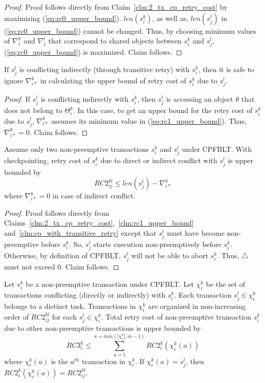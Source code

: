 %
\begin{proof}
%
Proof follows directly from Claim~\ref{clm:2_tx_cp_retry_cost} by maximizing (\ref{eq:rc0_upper_bound}). $len\left(s_i^k\right)$, as well as, $len\left(s_j^l\right)$ in (\ref{eq:rc0_upper_bound}) cannot be changed. Thus, by choosing minimum values of $\nabla_i^k$ and $\nabla_j^l$ that correspond to shared objects between $s_i^k$ and $s_j^l$, (\ref{eq:rc0_upper_bound}) is maximized. Claim follows.
%
\end{proof}
%
\begin{clm}\label{clm:cp_with_transitive_retry}
If $s_j^l$ is conflicting indirectly (through transitive retry) with $s_i^k$, then it is safe to ignore $\nabla_{i*}^k$ in calculating the upper bound of retry cost of $s_i^k$ due to $s_j^l$.
\end{clm}
%
\begin{proof}
If $s_j^l$ is conflicting indirectly with $s_i^k$, then $s_j^l$ is accessing an object $\theta$ that does not belong to $\Theta_i^k$. In this case, to get an upper bound for the retry cost of $s_i^k$ due to $s_j^l$, $\nabla_{i*}^k$ assumes its minimum value in (\ref{eq:rc1_upper_bound}). Thus, $\nabla_{i*}^k=0$. Claim follows.
\end{proof}
%
\begin{clm}\label{clm:non_preemptive_2tx_cpfblt_rc}
Assume only two non-preemptive transactions $s_i^k$ and $s_j^l$ under CPFBLT. With checkpointing, retry cost of $s_i^k$ due to direct or indirect conflict with $s_j^l$ is upper bounded by 
%
\begin{equation}
RC2_{ij}^{kl} \le len\left(s_{j}^{l}\right)-\nabla_{i*}^{k}\label{eq:rc2_upper_bound}
\end{equation}
%
where $\nabla_{i*}^k=0$ in case of indirect conflict.
%
\end{clm}
%
\begin{proof}
Proof follows directly from Claims~\ref{clm:2_tx_cp_retry_cost},~\ref{clm:rc1_upper_bound} and~\ref{clm:cp_with_transitive_retry} except that $s_j^l$ must have become non-preemptive before $s_i^k$. So, $s_j^l$ starts execution non-preemptively before $s_i^k$. Otherwise, by definition of CPFBLT, $s_j^l$ will not be able to abort $s_i^k$. Thus, $\triangle$ must not exceed 0. Claim follows.
\end{proof}
%
\begin{clm}\label{clm:non_preemptive_all_tx_rc}
Let $s_i^k$ be a non-preemptive transaction under CPFBLT. Let $\chi_i^k$ be the set of transactions conflicting (directly or indirectly) with $s_i^k$. Each transaction $s_j^l \in \chi_i^k$ belongs to a distinct task. Transactions in $\chi_i^k$ are organized in non-increasing order of $RC2_{ij}^{kl}$ for each $s_j^l \in \chi_i^k$. Total retry cost of non-preemptive transaction $s_i^k$ due to other non-preemptive transactions is upper bounded by 
%
\begin{equation}
RC3_i^k \le \sum_{a=1}^{a=min\left(|\chi_i^k|, m-1\right)} RC2_i^k\left(\chi_i^k(a)\right)
\label{eq:non_preemptive_all_tx_rc}
\end{equation}
%
where $\chi_i^k(a)$ is the $a^{th}$ transaction in $\chi_i^k$. If $\chi_i^k(a)=s_j^l$, then $RC2_i^k\left(\chi_i^k(a)\right)=RC2_{ij}^{kl}$.
%
\end{clm}

